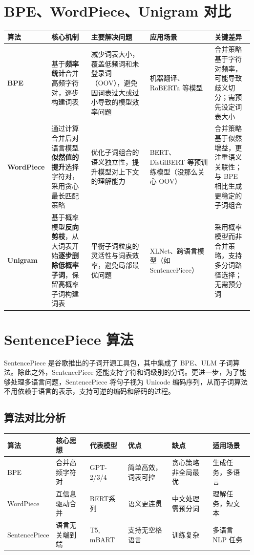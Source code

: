 \documentclass[11pt, a4paper]{article}
\begin{document}
\section{BPE、WordPiece、Unigram 对比}

\begin{table}[h]
\centering
\small
\renewcommand{\arraystretch}{1.5}
\begin{tabularx}{\textwidth}{|l|X|X|p{2.5cm}|X|}
\hline
\textbf{算法} & \textbf{核心机制} & \textbf{主要解决问题} & \textbf{应用场景} & \textbf{关键差异} \\ \hline
\textbf{BPE} & 基于\textbf{频率统计}合并高频字符对，逐步构建词表 & 减少词表大小，覆盖低频词和未登录词（OOV），避免因词表过大或过小导致的模型效率问题 & 机器翻译、RoBERTa 等模型 & 合并策略基于字符对频率，可能导致歧义切分；需预先设定词表大小 \\ \hline
\textbf{WordPiece} & 通过计算合并后对语言模型\textbf{似然值的提升}选择字符对，采用贪心最长匹配策略 & 优化子词组合的语义独立性，提升模型对上下文的理解能力 & BERT、DistilBERT 等预训练模型（没那么关心 OOV） & 合并策略基于似然增益，更注重语义关联性；与 BPE 相比生成更稳定的子词组合 \\ \hline
\textbf{Unigram} & 基于概率模型\textbf{反向剪枝}，从大词表开始\textbf{逐步删除低概率子词}，保留高概率子词构建词表 & 平衡子词粒度的灵活性与词表效率，避免局部最优问题 & XLNet、跨语言模型（如 SentencePiece） & 采用概率模型而非合并策略，支持多分词路径选择；无需预分词 \\ \hline
\end{tabularx}
\end{table}

\section{SentencePiece 算法}

SentencePiece 是谷歌推出的子词开源工具包，其中集成了 BPE、ULM 子词算法。除此之外，SentencePiece 还能支持字符和词级别的分词。更进一步，为了能够处理多语言问题，SentencePiece 将句子视为 Unicode 编码序列，从而子词算法不用依赖于语言的表示，支持可逆的编码和解码的过程。

\subsection*{算法对比分析}

\begin{table}[h]
\centering
\begin{tabularx}{\textwidth}{|l|l|l|X|X|l|}
\hline
\textbf{算法} & \textbf{核心思想} & \textbf{代表模型} & \textbf{优点} & \textbf{缺点} & \textbf{适用场景} \\ \hline
BPE & 合并高频字符对 & GPT-2/3/4 & 简单高效，词表可控 & 贪心策略非全局最优 & 生成任务，多语言 \\ \hline
WordPiece & 互信息驱动合并 & BERT系列 & 语义更连贯 & 中文处理需预分词 & 理解任务，短文本 \\ \hline
SentencePiece & 语言无关端到端 & T5, mBART & 支持无空格语言 & 训练复杂 & 多语言 NLP 任务 \\ \hline
\end{tabularx}
\end{table}
\end{document}
